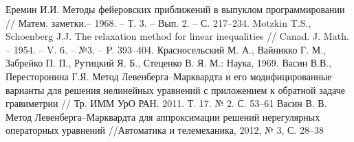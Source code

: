 \documentclass[14pt]{article}
\begin{document}
\begin{thebibliography}{2}
 Еремин И.И. Методы фейеровских приближений в выпуклом программировании // Матем. заметки.– 1968. – Т. 3. – Вып. 2. – С. 217–234.
 Motzkin T.S., Schoenberg J.J. The relaxation method for linear inequalities // Canad. J. Math. – 1954. – V. 6. – №3. – P. 393–404.
 Красносельский М. А., Вайникко Г. М., Забрейко П. П., Рутицкий Я. Б., Стеценко В. Я. М.: Наука, 1969.
 Васин В.В., Пересторонина Г.Я. Метод Левенберга–Марквардта и его модифицированные варианты для решения нелинейных уравнений с приложением к обратной задаче гравиметрии // Тр. ИММ УрО РАН. 2011. Т. 17. № 2. С. 53–61
 Васин В. В. Метод Левенберга–Марквардта для аппроксимации решений нерегулярных операторных уравнений //Автоматика и телемеханика, 2012, № 3, С. 28–38 

\end{thebibliography}
\end{document}
